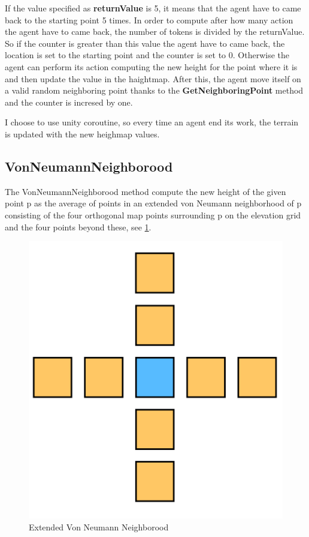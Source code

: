 \documentclass[12pt]{article}
\begin{document}
    If the value specified as \textbf{returnValue} is 5, it means that the agent have to came back to the starting point 5 times. In order to compute after how many action the agent
    have to came back, the number of tokens is divided by the returnValue. So if the counter is greater than this value the agent have to came back, the location is set to the
    starting point and the counter is set to 0. Otherwise the agent can perform its action computing the new height for the point where it is and then update the value in the haightmap.
    After this, the agent move itself on a valid random neighboring point thanks to the \textbf{GetNeighboringPoint} method and the counter is incresed by one.

    I choose to use unity coroutine, so every time an agent end its work, the terrain is updated with the new heighmap values.

    \subsection{VonNeumannNeighborood}
    The VonNeumannNeighborood method compute the new height of the given point p as the average of points in an extended von Neumann neighborhood of p consisting of the
    four orthogonal map points surrounding p on the elevation grid and the four points beyond these, see \ref{fig:vonNeumann}.
    \begin{figure}
        \centering
        \includegraphics[scale = 0.7]{images/Extended VonNeumannNeighborhood.png}
        \caption{Extended Von Neumann Neighborood}
        \label{fig:vonNeumann}
    \end{figure}
\end{document}
